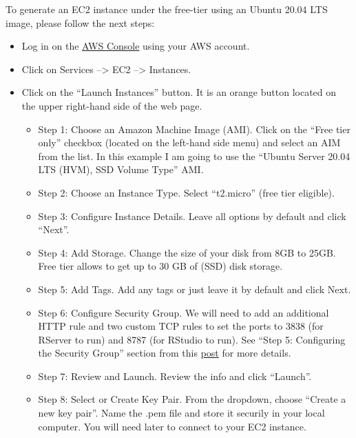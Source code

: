 \documentclass[]{book}
\providecommand{\tightlist}{%
  \setlength{\itemsep}{0pt}\setlength{\parskip}{0pt}}
\begin{document}
To generate an EC2 instance under the free-tier using an Ubuntu 20.04
LTS image, please follow the next steps:

\begin{itemize}
\item
  Log in on the
  \href{https://eu-west-2.console.aws.amazon.com/console/home?region=eu-west-2}{AWS
  Console} using your AWS account.
\item
  Click on Services --\textgreater{} EC2 --\textgreater{} Instances.
\item
  Click on the ``Launch Instances'' button. It is an orange button
  located on the upper right-hand side of the web page.

  \begin{itemize}
  \tightlist
  \item
    Step 1: Choose an Amazon Machine Image (AMI). Click on the ``Free
    tier only'' checkbox (located on the left-hand side menu) and select
    an AIM from the list. In this example I am going to use the ``Ubuntu
    Server 20.04 LTS (HVM), SSD Volume Type'' AMI.
  \item
    Step 2: Choose an Instance Type. Select ``t2.micro'' (free tier
    eligible).
  \item
    Step 3: Configure Instance Details. Leave all options by default and
    click ``Next''.
  \item
    Step 4: Add Storage. Change the size of your disk from 8GB to 25GB.
    Free tier allows to get up to 30 GB of (SSD) disk storage.
  \item
    Step 5: Add Tags. Add any tags or just leave it by default and click
    Next.
  \item
    Step 6: Configure Security Group. We will need to add an additional
    HTTP rule and two custom TCP rules to set the ports to 3838 (for
    RServer to run) and 8787 (for RStudio to run). See ``Step 5:
    Configuring the Security Group'' section from this
    \href{https://jagg19.github.io/2019/08/aws-r/}{post} for more
    details.
  \item
    Step 7: Review and Launch. Review the info and click ``Launch''.
  \item
    Step 8: Select or Create Key Pair. From the dropdown, choose
    ``Create a new key pair''. Name the .pem file and store it securily
    in your local computer. You will need later to connect to your EC2
    instance.
  \end{itemize}
\end{itemize}
\end{document}
